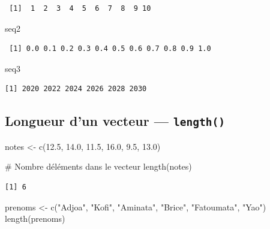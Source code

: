 \documentclass[
  french,
  11pt,
  a4paper,
]{article}
\newenvironment{Shaded}{}{}
\newcommand{\CommentTok}[1]{\textcolor[rgb]{0.42,0.45,0.49}{#1}}
\newcommand{\FloatTok}[1]{\textcolor[rgb]{0.00,0.36,0.77}{#1}}
\newcommand{\FunctionTok}[1]{\textcolor[rgb]{0.44,0.26,0.76}{#1}}
\newcommand{\NormalTok}[1]{\textcolor[rgb]{0.14,0.16,0.18}{#1}}
\newcommand{\OtherTok}[1]{\textcolor[rgb]{0.44,0.26,0.76}{#1}}
\newcommand{\StringTok}[1]{\textcolor[rgb]{0.01,0.18,0.38}{#1}}
\begin{document}
\begin{verbatim}
 [1]  1  2  3  4  5  6  7  8  9 10
\end{verbatim}

\begin{Shaded}
\begin{Highlighting}[]
\NormalTok{seq2}
\end{Highlighting}
\end{Shaded}

\begin{verbatim}
 [1] 0.0 0.1 0.2 0.3 0.4 0.5 0.6 0.7 0.8 0.9 1.0
\end{verbatim}

\begin{Shaded}
\begin{Highlighting}[]
\NormalTok{seq3}
\end{Highlighting}
\end{Shaded}

\begin{verbatim}
[1] 2020 2022 2024 2026 2028 2030
\end{verbatim}

\subsection{\texorpdfstring{Longueur d'un vecteur ---
\texttt{length()}}{Longueur d'un vecteur --- length()}}\label{longueur-dun-vecteur-length}

\begin{Shaded}
\begin{Highlighting}[]
\NormalTok{notes }\OtherTok{\textless{}{-}} \FunctionTok{c}\NormalTok{(}\FloatTok{12.5}\NormalTok{, }\FloatTok{14.0}\NormalTok{, }\FloatTok{11.5}\NormalTok{, }\FloatTok{16.0}\NormalTok{, }\FloatTok{9.5}\NormalTok{, }\FloatTok{13.0}\NormalTok{)}

\CommentTok{\# Nombre d\textquotesingle{}éléments dans le vecteur}
\FunctionTok{length}\NormalTok{(notes)}
\end{Highlighting}
\end{Shaded}

\begin{verbatim}
[1] 6
\end{verbatim}

\begin{Shaded}
\begin{Highlighting}[]
\NormalTok{prenoms }\OtherTok{\textless{}{-}} \FunctionTok{c}\NormalTok{(}\StringTok{"Adjoa"}\NormalTok{, }\StringTok{"Kofi"}\NormalTok{, }\StringTok{"Aminata"}\NormalTok{, }\StringTok{"Brice"}\NormalTok{, }\StringTok{"Fatoumata"}\NormalTok{, }\StringTok{"Yao"}\NormalTok{)}
\FunctionTok{length}\NormalTok{(prenoms)}
\end{Highlighting}
\end{Shaded}
\end{document}
